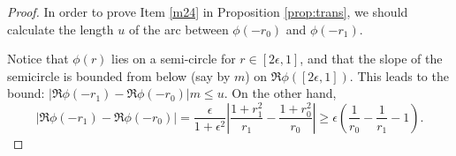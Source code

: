 {\begin{proof}
In order to prove Item \ref{m24} in Proposition \ref{prop:trans}, we should calculate the length $u$ of the arc between $\phi(-r_0)$ and $\phi(-r_1)$.

Notice that $\phi(r)$ lies on a semi-circle for $r\in[2\epsilon,1]$, and that the slope of the semicircle is bounded from below (say by $m$) on $\Re\phi([2\epsilon,1])$. This leads to the bound: $|\Re\phi(-r_1)-\Re\phi(-r_0)| m \le u$.
On the other hand,
$$|\Re\phi(-r_1)-\Re\phi(-r_0)|=\frac{\epsilon}{1+\epsilon^2}\left|\frac{1+r_1^2}{r_1}-\frac{1+r_0^2}{r_0}\right|\ge\epsilon\left(\frac 1 {r_0} - \frac 1{r_1}-1 \right). $$

\end{proof}




}
